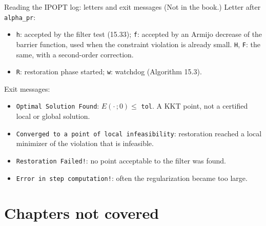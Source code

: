 \documentclass[aspectratio=169,12pt]{beamer}
\begin{document}
\begin{frame}{Reading the IPOPT log: letters and exit messages {\normalfont\small(Not in the book.)}}
  Letter after \texttt{alpha\_pr}:
  \begin{itemize}\setlength\itemsep{0.25em}
    \item \texttt{h}: accepted by the filter test (15.33); \texttt{f}: accepted by an Armijo decrease of the
      barrier function, used when the constraint violation is already small.
      \texttt{H}, \texttt{F}: the same, with a second-order correction.
    \item \texttt{R}: restoration phase started; \texttt{w}: watchdog (Algorithm 15.3).
  \end{itemize}
  Exit messages:
  \begin{itemize}\setlength\itemsep{0.25em}
    \item \texttt{Optimal Solution Found}: $E(\cdot\,;0)\le$ \texttt{tol}. A KKT point, not a certified local
      or global solution.
    \item \texttt{Converged to a point of local infeasibility}: restoration reached a local minimizer of the
      violation that is infeasible.
    \item \texttt{Restoration Failed!}: no point acceptable to the filter was found.
    \item \texttt{Error in step computation!}: often the regularization became too large.
  \end{itemize}
\end{frame}

\section{Chapters not covered}
\end{document}
